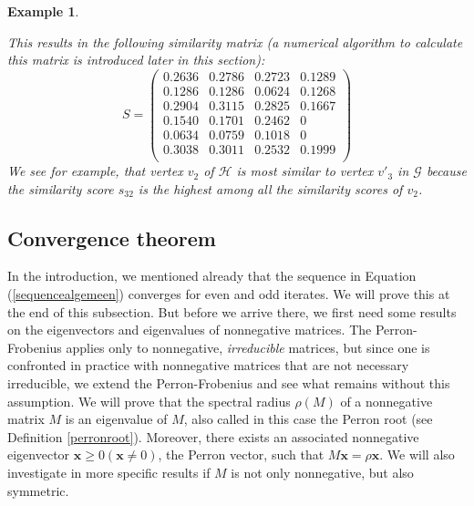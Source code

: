 \documentclass[a4paper,11pt]{report}
\newtheorem{example}[theorem]{Example}
\newcommand{\graf}{\mathscr{G}}
\newcommand{\grafeen}{\mathscr{H}}
\begin{document}
\begin{example}
\begin{center}
\end{center}
This results in the following similarity matrix (a numerical algorithm to calculate this matrix is introduced later
in this section):
$$S = \begin{pmatrix}
0.2636 & 0.2786 & 0.2723 & 0.1289 \\
0.1286 & 0.1286 & 0.0624 & 0.1268 \\
0.2904 & 0.3115 & 0.2825 & 0.1667 \\
0.1540 & 0.1701 & 0.2462 & 0 \\
0.0634 & 0.0759 & 0.1018 & 0 \\
0.3038 & 0.3011 & 0.2532 & 0.1999\\
 \end{pmatrix}$$
 We see for example, that vertex $v_2$ of $\grafeen$ is most similar to
 vertex $v'_3$ in $\graf$  because the similarity score $s_{32}$ 
 is the highest among all the similarity scores of $v_{2}$.
 \end{example}
 
 \subsection{Convergence theorem}
In the introduction, we mentioned already that the sequence in Equation (\ref{sequencealgemeen})
converges for even and odd iterates. We will prove this at the end of this subsection. But before we 
arrive there, we first need some results on the eigenvectors and eigenvalues of nonnegative matrices. 
The Perron-Frobenius applies only to nonnegative, \emph{irreducible} matrices, 
but  since one is confronted in practice 
with nonnegative matrices that are not necessary irreducible,  we extend the Perron-Frobenius and see what remains without this assumption. 
We will prove that the spectral radius $\rho(M)$ of a nonnegative matrix 
$M$ is an eigenvalue of $M$, also called in this case the Perron root (see Definition \ref{perronroot}). Moreover, there exists an 
associated nonnegative eigenvector $\mathbf{x} \geq 0 (\mathbf{x} \not = 0)$, the Perron vector, such 
that $M\mathbf{x} = \rho\mathbf{x}$.  We will also investigate in more specific 
results if $M$ is not only nonnegative, but also symmetric. 
\end{document}
